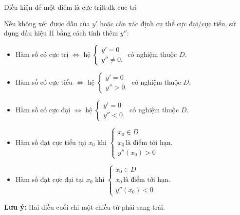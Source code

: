 \begin{lythuyetbox}{Điều kiện để một điểm là cực trị}{lt:dk-cuc-tri}
\begin{enumerate}
\begin{itemize}
        Nếu không xét được dấu của $y'$ hoặc cần xác định cụ thể cực đại/cực tiểu, sử dụng dấu hiệu II bằng cách tính thêm $y''$:
        \begin{itemize}
            \item Hàm số có cực trị $\Leftrightarrow$ hệ $\left\{ \begin{array}{l} y' = 0 \\ y'' \neq 0. \end{array} \right.$ có nghiệm thuộc $D$.
            \item Hàm số có cực tiểu $\Leftrightarrow$ hệ $\left\{ \begin{array}{l} y' = 0 \\ y'' > 0. \end{array} \right.$ có nghiệm thuộc $D$.
            \item Hàm số có cực đại $\Leftrightarrow$ hệ $\left\{ \begin{array}{l} y' = 0 \\ y'' < 0. \end{array} \right.$ có nghiệm thuộc $D$.
            \item Hàm số đạt cực tiểu tại $x_0$ khi $\left\{ \begin{array}{l} x_0 \in D \\ x_0 \,\text{là điểm tới hạn.} \\ y''(x_0) > 0 \end{array} \right.$
            \item Hàm số đạt cực đại tại $x_0$ khi $\left\{ \begin{array}{l} x_0 \in D \\ x_0 \,\text{là điểm tới hạn.} \\ y''(x_0) < 0 \end{array} \right.$
        \end{itemize}

        \textbf{Lưu ý:} Hai điều cuối chỉ một chiều từ phải sang trái.
    \end{itemize}
\end{enumerate}
\end{lythuyetbox}


